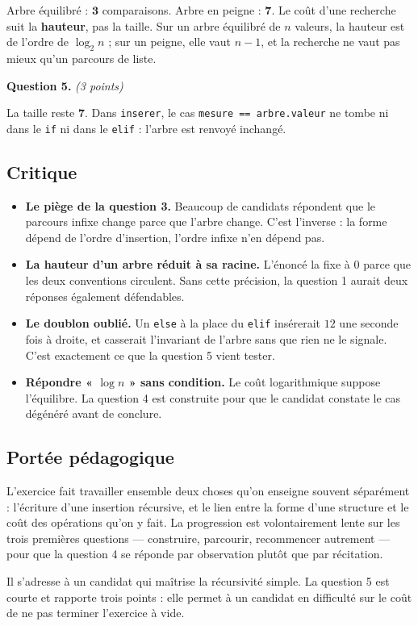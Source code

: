 Arbre équilibré : $\mathbf{3}$ comparaisons. Arbre en peigne :
$\mathbf{7}$. Le coût d'une recherche suit la \textbf{hauteur}, pas la taille.
Sur un arbre équilibré de $n$ valeurs, la hauteur est de l'ordre de
$\log_2 n$ ; sur un peigne, elle vaut $n - 1$, et la recherche ne vaut pas
mieux qu'un parcours de liste.

\medskip
\textbf{Question 5.} \emph{(3 points)}

La taille reste $\mathbf{7}$. Dans \lstinline{inserer}, le cas
\lstinline{mesure == arbre.valeur} ne tombe ni dans le \lstinline{if} ni dans
le \lstinline{elif} : l'arbre est renvoyé inchangé.

\subsection*{Critique}

\begin{itemize}
  \item \textbf{Le piège de la question 3.} Beaucoup de candidats répondent que
    le parcours infixe change parce que l'arbre change. C'est l'inverse : la
    forme dépend de l'ordre d'insertion, l'ordre infixe n'en dépend pas.
  \item \textbf{La hauteur d'un arbre réduit à sa racine.} L'énoncé la fixe à
    $0$ parce que les deux conventions circulent. Sans cette précision, la
    question 1 aurait deux réponses également défendables.
  \item \textbf{Le doublon oublié.} Un \lstinline{else} à la place du
    \lstinline{elif} insérerait $12$ une seconde fois à droite, et casserait
    l'invariant de l'arbre sans que rien ne le signale. C'est exactement ce que
    la question 5 vient tester.
  \item \textbf{Répondre « $\log n$ » sans condition.} Le coût logarithmique
    suppose l'équilibre. La question 4 est construite pour que le candidat
    constate le cas dégénéré avant de conclure.
\end{itemize}

\subsection*{Portée pédagogique}

L'exercice fait travailler ensemble deux choses qu'on enseigne souvent
séparément : l'écriture d'une insertion récursive, et le lien entre la forme
d'une structure et le coût des opérations qu'on y fait. La progression est
volontairement lente sur les trois premières questions — construire, parcourir,
recommencer autrement — pour que la question 4 se réponde par observation
plutôt que par récitation.

Il s'adresse à un candidat qui maîtrise la récursivité simple. La question 5 est
courte et rapporte trois points : elle permet à un candidat en difficulté sur le
coût de ne pas terminer l'exercice à vide.
